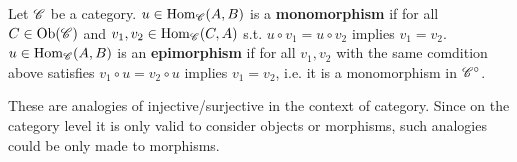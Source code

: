 \documentclass{article}
\begin{document}
\begin{definition}
    Let $\mathscr{C}$ be a category. $u\in \mathrm{Hom}_{\mathscr{C}}(A, B)$ is a \textbf{monomorphism} if for all $C \in \mathrm{Ob}(\mathscr{C})$ and $v_1, v_2 \in \mathrm{Hom}_{\mathscr{C}}(C, A)$ s.t. $u \circ v_1 = u \circ v_2$ implies $v_1 = v_2$. $u\in \mathrm{Hom}_{\mathscr{C}}(A, B)$ is an \textbf{epimorphism} if for all $v_1, v_2$ with the same comdition above satisfies $v_1 \circ u = v_2 \circ u$ implies $v_1 = v_2$, i.e. it is a monomorphism in $\mathscr{C}^{\circ}$.
\end{definition}

\begin{remark}
    These are analogies of injective/surjective in the context of category. Since on the category level it is only valid to consider objects or morphisms, such analogies could be only made to morphisms.
\end{remark}
\end{document}
